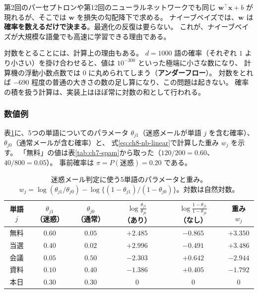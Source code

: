 第2回のパーセプトロンや第12回のニューラルネットワークでも同じ $\bm{w}^\top\bm{x} + b$ が現れるが、そこでは $\bm{w}$ を損失の勾配降下で求める。
ナイーブベイズでは、$\bm{w}$ は\textbf{確率を数えるだけで決まる}。最適化の反復は要らない。
これが、ナイーブベイズが大規模な語彙でも高速に学習できる理由である。

対数をとることには、計算上の理由もある。
$d = 1000$ 語の確率（それぞれ $1$ より小さい）を掛け合わせると、値は $10^{-300}$ といった極端に小さな数になり、
計算機の浮動小数点数では $0$ に丸められてしまう（\textbf{アンダーフロー}）。
対数をとれば $-690$ 程度の普通の大きさの数の足し算になり、この問題は起きない。
確率の積を扱う計算は、実装上はほぼ常に対数の和として行われる。

\subsubsection{数値例}

表\ref{tab:ch8-words}に、5つの単語についてのパラメータ $\theta_{j1}$（迷惑メールが単語 $j$ を含む確率）、$\theta_{j0}$（通常メールが含む確率）と、
式\eqref{eq:ch8-nb-linear}で計算した重み $w_j$ を示す。
「無料」の値は表\ref{tab:ch7-spam}から取った（$120/200 = 0.60$、$40/800 = 0.05$）。
事前確率は $\pi = P(\text{迷惑}) = 0.20$ である。

\begin{table}[H]
  \centering
  \caption{迷惑メール判定に使う5単語のパラメータと重み。$w_j = \log(\theta_{j1}/\theta_{j0}) - \log\{(1 - \theta_{j1})/(1 - \theta_{j0})\}$。対数は自然対数。}
  \label{tab:ch8-words}
  \begin{tabular}{c|cc|cc|c}
    \hline
    単語 $j$ & $\theta_{j1}$（迷惑） & $\theta_{j0}$（通常） & $\log\frac{\theta_{j1}}{\theta_{j0}}$（あり） & $\log\frac{1 - \theta_{j1}}{1 - \theta_{j0}}$（なし） & 重み $w_j$ \\
    \hline\hline
    無料 & $0.60$ & $0.05$ & $+2.485$ & $-0.865$ & $+3.350$ \\
    当選 & $0.40$ & $0.02$ & $+2.996$ & $-0.491$ & $+3.486$ \\
    会議 & $0.05$ & $0.50$ & $-2.303$ & $+0.642$ & $-2.944$ \\
    資料 & $0.10$ & $0.40$ & $-1.386$ & $+0.405$ & $-1.792$ \\
    本日 & $0.30$ & $0.30$ & $0$ & $0$ & $0$ \\
    \hline
  \end{tabular}
\end{table}

